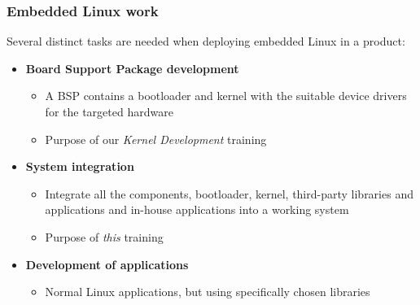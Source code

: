 \begin{frame}
  \frametitle{Embedded Linux work}

  Several distinct tasks are needed when deploying embedded Linux in a
  product:

  \begin{itemize}
  \item {\bf Board Support Package development}
    \begin{itemize}
    \item A BSP contains a bootloader and kernel with the suitable
      device drivers for the targeted hardware
    \item Purpose of our {\em Kernel Development} training
    \end{itemize}
  \item {\bf System integration}
    \begin{itemize}
    \item Integrate all the components, bootloader, kernel,
      third-party libraries and applications and in-house applications
      into a working system
    \item Purpose of {\em this} training
    \end{itemize}
  \item {\bf Development of applications}
    \begin{itemize}
    \item Normal Linux applications, but using specifically chosen
      libraries
    \end{itemize}
  \end{itemize}
\end{frame}
